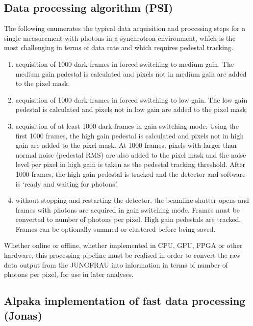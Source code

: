 \documentclass[a4paper]{article}
\begin{document}
\subsection{Data processing algorithm (PSI)}
\label{subsec:alg}
The following enumerates the typical data acquisition and processing steps for a single measurement with photons in a synchrotron environment, which is the most challenging in terms of data rate and which requires pedestal tracking.
\begin{enumerate}
\item acquisition of 1000 dark frames in forced switching to medium gain. The medium gain pedestal is calculated and pixels not in medium gain are added to the pixel mask.
\item acquisition of 1000 dark frames in forced switching to low gain. The low gain pedestal is calculated and pixels not in low gain are added to the pixel mask.
\item acquisition of at least 1000 dark frames in gain switching mode. Using the first 1000 frames, the high gain pedestal is calculated and pixels not in high gain are added to the pixel mask. At 1000 frames, pixels with larger than normal noise (pedestal RMS) are also added to the pixel mask and the noise level per pixel in high gain is taken as the pedestal tracking threshold. After 1000 frames, the high gain pedestal is tracked and the detector and software is `ready and waiting for photons'.
\item without stopping and restarting the detector, the beamline shutter opens and frames with photons are acquired in gain switching mode. Frames must be converted to number of photons per pixel. High gain pedestals are tracked. Frames can be optionally summed or clustered before being saved.
\end{enumerate}
Whether online or offline, whether implemented in CPU, GPU, FPGA or other hardware, this processing pipeline must be realised in order to convert the raw data output from the JUNGFRAU into information in terms of number of photons per pixel, for use in later analyses.


\subsection{Alpaka implementation of fast data processing (Jonas)}
\label{subsec:alpaka}
\end{document}
